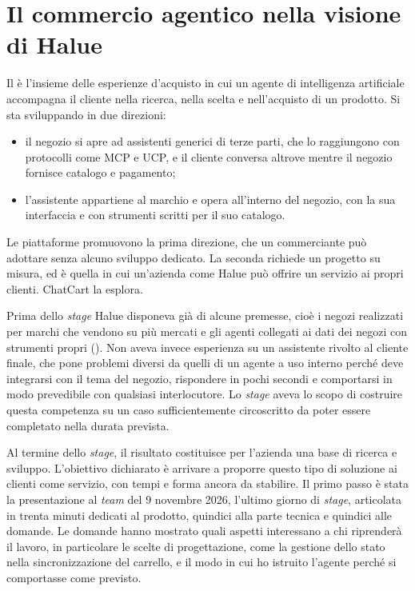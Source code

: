 
\section{Il commercio agentico nella visione di Halue}
\label{sec:commercio-agentico}

Il  è l’insieme delle esperienze d’acquisto in cui un
agente di intelligenza artificiale accompagna il cliente nella ricerca, nella scelta e
nell’acquisto di un prodotto. Si sta sviluppando in due direzioni:

\begin{itemize}
	\item il negozio si apre ad assistenti generici di terze parti, che lo raggiungono con protocolli
	come MCP e UCP, e il cliente conversa altrove mentre il negozio fornisce catalogo e pagamento;
	\item l’assistente appartiene al marchio e opera all’interno del negozio, con la sua interfaccia
	e con strumenti scritti per il suo catalogo.
\end{itemize}

Le piattaforme promuovono la prima direzione, che un commerciante può adottare senza alcuno
sviluppo dedicato. La seconda richiede un progetto su misura, ed è quella in cui un’azienda come
Halue può offrire un servizio ai propri clienti. ChatCart la esplora.

Prima dello \emph{stage} Halue disponeva già di alcune premesse, cioè i negozi realizzati per
marchi che vendono su più mercati e gli agenti collegati ai dati dei negozi con strumenti propri
(). Non aveva invece esperienza su un assistente rivolto al cliente finale,
che pone problemi diversi da quelli di un agente a uso interno perché deve integrarsi con il tema
del negozio, rispondere in pochi secondi e comportarsi in modo prevedibile con qualsiasi
interlocutore. Lo \emph{stage} aveva lo scopo di costruire questa competenza su un caso
sufficientemente circoscritto da poter essere completato nella durata prevista.

Al termine dello \emph{stage}, il risultato costituisce per l’azienda una base di ricerca e
sviluppo. L’obiettivo dichiarato è arrivare a proporre questo tipo di soluzione ai clienti come
servizio, con tempi e forma ancora da stabilire. Il primo passo è stata la presentazione al
\emph{team} del 9 novembre 2026, l’ultimo giorno di \emph{stage}, articolata in trenta minuti
dedicati al prodotto, quindici alla parte tecnica e quindici alle domande. Le domande hanno
mostrato quali aspetti interessano a chi riprenderà il lavoro, in particolare le scelte di
progettazione, come la gestione dello stato nella sincronizzazione del carrello, e il modo in cui
ho istruito l’agente perché si comportasse come previsto.

